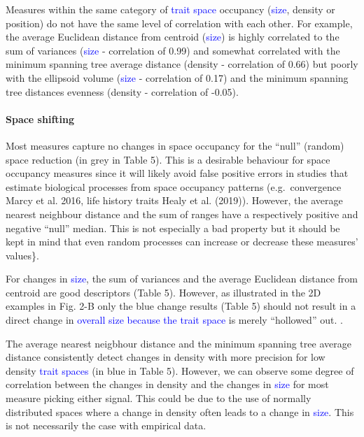 \documentclass[]{article}
\let\oldparagraph\paragraph
\renewcommand{\paragraph}[1]{\oldparagraph{#1}\mbox{}}
\begin{document}
Measures within the same category of
\textcolor{blue}{trait space} occupancy
(\textcolor{blue}{size}, density or position) do not have
the same level of correlation with each other. For example, the average
Euclidean distance from centroid (\textcolor{blue}{size}) is
highly correlated to the sum of variances
(\textcolor{blue}{size} - correlation of 0.99) and somewhat
correlated with the minimum spanning tree average distance (density -
correlation of 0.66) but poorly with the ellipsoid volume
(\textcolor{blue}{size} - correlation of 0.17) and the
minimum spanning tree distances evenness (density - correlation of
-0.05).

\paragraph{Space shifting}\label{caveats}

Most measures capture no changes in space occupancy for the ``null''
(random) space reduction (in grey in Table 5). This is a desirable
behaviour for space occupancy measures since it will likely avoid false
positive errors in studies that estimate biological processes from space
occupancy patterns (e.g.~convergence Marcy et al. 2016, life history
traits Healy et al. (2019)). However, the average nearest neighbour
distance and the sum of ranges have a respectively positive and negative
``null'' median. This is not especially a bad property but it should be
kept in mind that even random processes can increase or decrease these
measures' values\}.

For changes in \textcolor{blue}{size}, the sum of variances
and the average Euclidean distance from centroid are good descriptors
(Table 5). However, as illustrated in the 2D examples in Fig. 2-B only
the blue change results (Table 5) should not result in a direct change
in \textcolor{blue}{overall size because the trait space} is
merely ``hollowed'' out. .

The average nearest neigbhour distance and the minimum spanning tree
average distance consistently detect changes in density with more
precision for low density \textcolor{blue}{trait spaces} (in
blue in Table 5). However, we can observe some degree of correlation
between the changes in density and the changes in
\textcolor{blue}{size} for most measure picking either
signal. This could be due to the use of normally distributed spaces
where a change in density often leads to a change in
\textcolor{blue}{size}. This is not necessarily the case
with empirical data.
\end{document}
